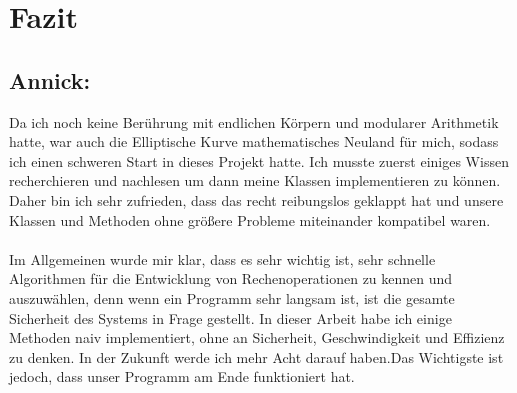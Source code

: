 \chapter{Fazit}

\section*{Annick:}
Da ich noch keine Berührung mit endlichen Körpern und modularer Arithmetik hatte, war auch die Elliptische Kurve mathematisches Neuland für mich, sodass ich einen schweren Start in dieses Projekt hatte. Ich musste zuerst einiges Wissen recherchieren und nachlesen um dann meine Klassen implementieren zu können. Daher bin ich sehr zufrieden, dass das recht reibungslos geklappt hat und unsere Klassen und Methoden ohne größere Probleme miteinander kompatibel waren. \\
\\
Im Allgemeinen wurde mir klar, dass es sehr wichtig ist, sehr schnelle Algorithmen für die Entwicklung von Rechenoperationen zu kennen und auszuwählen, denn wenn ein Programm sehr langsam ist, ist die gesamte Sicherheit des Systems in Frage gestellt. In dieser Arbeit habe ich einige Methoden naiv implementiert, ohne an Sicherheit, Geschwindigkeit und Effizienz zu denken. In der Zukunft werde ich mehr Acht darauf haben.Das Wichtigste ist jedoch, dass unser Programm am Ende funktioniert hat.


